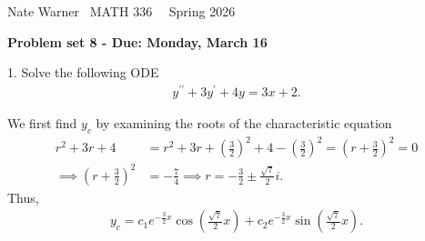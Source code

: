 \documentclass{report}
\title{\Huge{}}
\author{\huge{Nathan Warner}}
\date{\huge{}}
\begin{document}
    \pagebreak \bigbreak \noindent
    Nate Warner \ \quad \quad \quad \quad \quad \quad \quad \quad \quad \quad \quad \quad  MATH 336 \quad  \quad \quad \quad \quad \quad \quad \quad \quad \ \ \quad \quad Spring 2026
    \begin{center}
        \textbf{Problem set 8 - Due: Monday, March 16}
    \end{center}
    \bigbreak \noindent 
    \begin{mdframed}
        1. Solve the following ODE
        \begin{align*}
            y^{\prime\prime} + 3y^{\prime} + 4y = 3x + 2
        .\end{align*}
    \end{mdframed}
    \bigbreak \noindent 
    We first find $y_{c}$ by examining the roots of the characteristic equation
    \begin{align*}
        r^{2} + 3r + 4 &= r^{2} + 3r + \left(\frac{3}{2}\right)^{2} + 4 - \left(\frac{3}{2}\right)^{2} = \left(r+\frac{3}{2}\right)^{2}= 0 \\
        \implies \left(r+\frac{3}{2}\right)^{2} &= -\frac{7}{4} \implies r = -\frac{3}{2}\pm \frac{\sqrt{7}}{2}i
    .\end{align*}
    Thus,
    \begin{align*}
        y_{c} = c_{1}e^{-\frac{3}{2}x}\cos{\left(\frac{\sqrt{7}}{2}x\right)} + c_{2}e^{-\frac{3}{2}x}\sin{\left(\frac{\sqrt{7}}{2}x\right)}
    .\end{align*}
\end{document}
